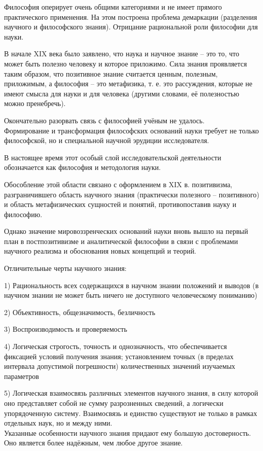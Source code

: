 \documentclass[exam_answers.tex]{subfiles}
\begin{document}
\renewcommand{\baselinestretch}{0.75}

Философия оперирует очень общими категориями и не имеет прямого практического применения.
На этом построена проблема демаркации (разделения научного и философского знания).
Отрицание рациональной роли философии для науки.

В начале XIX века было заявлено, что наука и научное знание – это то, что может быть полезно человеку и которое приложимо.
Сила знания проявляется таким образом, что позитивное знание считается ценным, полезным, приложимым, а философия – это метафизика, т. е. это рассуждения, которые не имеют смысла для науки и для человека (другими словами, её полезностью можно пренебречь).

Окончательно разорвать связь с философией учёным не удалось.
\\

Формирование и трансформация философских оснований науки требует не только философской, но и специальной научной эрудиции исследователя.

В настоящее время этот особый слой исследовательской деятельности обозначается как философия и методология науки.

Обособление этой области связано с оформлением в XIX в. позитивизма, разграничившего область научного знания (практически полезного – позитивного) и область метафизических сущностей и понятий, противопоставив науку и философию.

Однако значение мировоззренческих оснований науки вновь вышло на первый план в постпозитивизме и аналитической философии в связи с проблемами научного реализма и обоснования новых концепций и теорий.

Отличительные черты научного знания:

1) Рациональность всех содержащихся в научном знании положений и выводов (в научном знании не может быть ничего не доступного человеческому пониманию)

2) Объективность, общезначимость, безличность

3) Воспроизводимость и проверяемость

4) Логическая строгость, точность и однозначность, что обеспечивается фиксацией условий получения знания; установлением точных (в пределах интервала допустимой погрешности) количественных значений изучаемых параметров

5) Логическая взаимосвязь различных элементов научного знания, в силу которой оно представляет собой не сумму разрозненных сведений, а логически упорядоченную систему.
Взаимосвязь и единство существуют не только в рамках отдельных наук, но и между ними.
\\

Указанные особенности научного знания придают ему большую достоверность.
Оно является более надёжным, чем любое другое знание.
\end{document}
